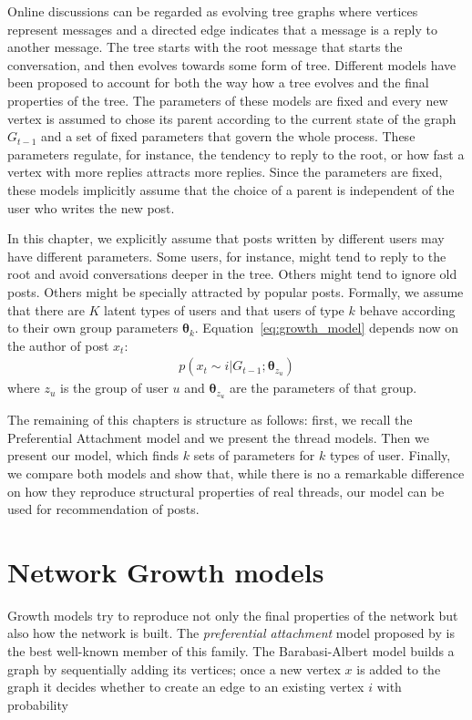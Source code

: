 \documentclass[smallextended]{svjour3}          %
\begin{document}
Online discussions can be regarded as evolving tree graphs where vertices represent messages and a directed edge indicates that a message is a reply to another message. The tree starts with the root message that starts the conversation, and then evolves towards some form of tree. Different models have been proposed to account for both the way how a tree evolves and the final properties of the tree. The parameters of these models are fixed and every new vertex is assumed to chose its parent according to the current state of the graph $G_{t-1}$ and a set of fixed parameters that govern the whole process. These parameters regulate, for instance, the tendency to reply to the root, or how fast a vertex with more replies attracts more replies.  Since the parameters are fixed, these models implicitly assume that the choice of a parent is independent of the user who writes the new post.

In this chapter, we explicitly assume that posts written by different users may have different parameters. Some users, for instance, might tend to reply to the root and avoid conversations deeper in the tree. Others might tend to ignore old posts. Others might be specially attracted by popular posts. Formally, we assume that there are $K$ latent types of users and that users of type $k$ behave according to their own group parameters $\boldsymbol{\theta}_k$.  Equation~\ref{eq:growth_model} depends now on the author of post $x_t$:
\begin{align*}
p(x_t \sim i | G_{t-1}; \boldsymbol{\theta}_{z_u})
\end{align*}
where $z_u$ is the group of user $u$ and  $\boldsymbol{\theta}_{z_u}$ are the parameters of that group.

The remaining of this chapters is structure as follows: first, we recall the Preferential Attachment model and we present the thread models. Then we present our model, which finds $k$ sets of parameters for $k$ types of user. Finally, we compare both models and show that, while there is no a remarkable difference on how they reproduce structural properties of real threads, our model can be used for recommendation of posts. 

\section{Network Growth models}\label{sec:related-work}

Growth models try to reproduce not only the final properties of the network but also how the network is built. The \textit{preferential attachment} model proposed by \cite{Barabasi1999} is the best well-known member of this family.
The Barabasi-Albert model builds a graph by sequentially adding its vertices; once a new vertex $x$ is added to the graph it decides whether to create an edge to an existing vertex $i$ with probability
\end{document}
